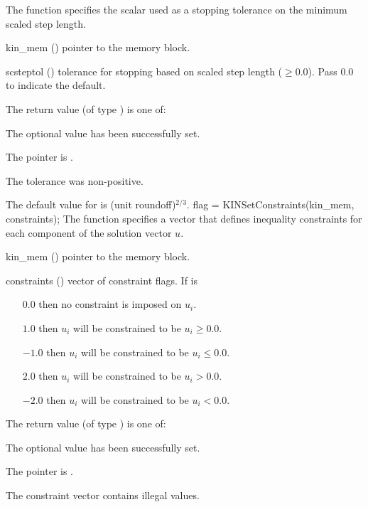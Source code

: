 {
  The function  specifies the scalar used
  as a stopping tolerance on the minimum scaled step length.
}
{
  \begin{args}[scsteptol]
  \item[kin\_mem] ()
    pointer to the {\kinsol} memory block.
  \item[scsteptol] ()
    tolerance for stopping based on scaled step length ($\geq 0.0$).
    Pass $0.0$ to indicate the default. 
  \end{args}
}
{
  The return value  (of type ) is one of:
  \begin{args}
  \item[\Id{KIN\_SUCCESS}] 
    The optional value has been successfully set.
  \item[\Id{KIN\_MEM\_NULL}]
    The  pointer is .
  \item[\Id{KIN\_ILL\_INPUT}]
    The tolerance was non-positive.
  \end{args}
}
{
  The default value for  is (unit roundoff)$^{2/3}$.
}
{
flag = KINSetConstraints(kin\_mem, constraints);
}
{
  The function  specifies a vector that defines
  inequality constraints for each component of the solution vector $u$.
}
{
  \begin{args}[constraints]
  \item[kin\_mem] ()
    pointer to the {\kinsol} memory block.
  \item[constraints] ()
    vector of constraint flags. If  is
    \begin{itemize}    
    \item[$0.0$] then no constraint is imposed on $u_i$. 
    \item[$1.0$] then $u_i$ will be constrained to be $u_i \ge 0.0$.
    \item[$-1.0$] then $u_i$ will be constrained to be $u_i \le 0.0$.
    \item[$2.0$] then $u_i$ will be constrained to be $u_i > 0.0$.
    \item[$-2.0$] then $u_i$ will be constrained to be $u_i < 0.0$.
    \end{itemize}
  \end{args}
}
{
  The return value  (of type ) is one of:
  \begin{args}
  \item[\Id{KIN\_SUCCESS}] 
    The optional value has been successfully set.
  \item[\Id{KIN\_MEM\_NULL}]
    The  pointer is .
  \item[\Id{KIN\_ILL\_INPUT}]
    The constraint vector contains illegal values.
  \end{args}
}
